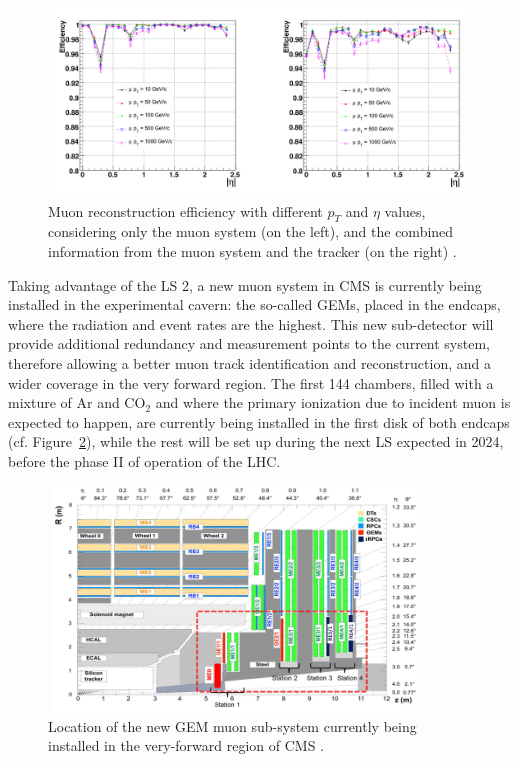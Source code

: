 \documentclass[a4paper, 10pt, openright]{report}
\begin{document}
\begin{figure}[htbp]
\begin{center}
\includegraphics[width=12cm, height=5cm]{figs/muonRecoEff.png}
\caption{Muon reconstruction efficiency with different $p_T$ and $\eta$ values, considering only the muon system (on the left), and the combined information from the muon system and the tracker (on the right) \cite{CMSDescription}.}
\label{fig:MuonRecoEff}
\end{center}
\end{figure}

Taking advantage of the \acf{LS} 2, a new muon system in \ac{CMS} is currently being installed in the experimental cavern: the so-called \acfp{GEM}, placed in the endcaps, where the radiation and event rates are the highest. This new sub-detector will provide additional redundancy and measurement points to the current system, therefore allowing a better muon track identification and reconstruction, and a wider coverage in the very forward region. The first 144 chambers, filled with a mixture of Ar and CO$_2$ and where the primary ionization due to incident muon is expected to happen, are currently being installed in the first disk of both endcaps (cf. Figure~\ref{fig:CMSGEM}), while the rest will be set up during the next \ac{LS} expected in 2024, before the phase II of operation of the \ac{LHC}.

\begin{figure}[htbp]
\begin{center}
\includegraphics[width=10cm, height=6cm]{figs/CMSGEM.png}
\caption{Location of the new \ac{GEM} muon sub-system currently being installed in the very-forward region of \ac{CMS} \cite{CMSDescription}.}
\label{fig:CMSGEM}
\end{center}
\end{figure}
\end{document}
